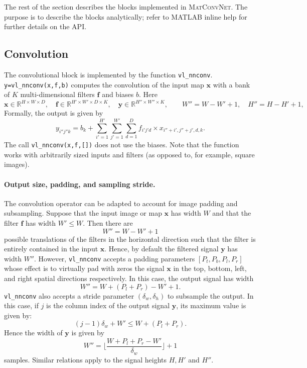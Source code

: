 \documentclass[12pt]{article}
\newcommand{\real}{\mathbb{R}}
\newcommand{\vlnn}{\textsc{MatConvNet}\xspace}
\newcommand{\bx}{\mathbf{x}}
\newcommand{\by}{\mathbf{y}}
\newcommand{\bff}{\mathbf{f}}
\begin{document}
The rest of the section describes the blocks implemented in \vlnn. The purpose is to describe the blocks analytically; refer to MATLAB inline help for further details on the API.

\subsection{Convolution}\label{s:convolution}

The convolutional block is implemented by the function \verb!vl_nnconv!. \verb!y=vl_nnconv(x,f,b)! computes the convolution of the input map $\bx$ with a bank of $K$ multi-dimensional filters $\bff$ and biases $b$. Here
\[
 \bx\in\real^{H \times W \times D}, \quad
 \bff\in\real^{H' \times W' \times D \times K}, \quad
 \by\in\real^{H'' \times W'' \times K}, \quad
 \quad
 W'' = W - W' + 1,
 \quad
 H'' = H - H' + 1,
\]
Formally, the output  is given by
\[
y_{i''j''k}
=
b_k
+
\sum_{i'=1}^{H'}
\sum_{j'=1}^{W'}
\sum_{d=1}^D
f_{i'j'd} \times x_{i''+i',j''+j',d,k}.
\]
The call \verb!vl_nnconv(x,f,[])! does not use the biases. Note that the function works with arbitrarily sized inputs and filters (as opposed to, for example, square images).

\paragraph{Output size, padding, and sampling stride.} The convolution operator can be adapted to account for image padding and subsampling. Suppose that the input image or map $\bx$ has width $W$ and that the filter $\bff$ has width $W' \leq W$. Then there are 
\[
  W'' = W - W' + 1
\]
possible translations of the filters in the horizontal direction such that the filter is entirely contained in the input $\bx$. Hence, by default the filtered signal $\by$ has width $W''$. However, \verb!vl_nnconv! accepts a padding parameters $[P_t,P_b,P_l,P_r]$ whose effect is to virtually pad with zeros the signal $\bx$ in the top, bottom, left, and right  spatial directions respectively. In this case, the output signal has width
\[
  W'' = W + (P_l + P_r) - W' + 1.
\]
\verb!vl_nnconv! also accepts a stride parameter $(\delta_w,\delta_h)$ to subsample the output. In this case, if $j$ is the column index of the output signal $\by$, its maximum value is given by:
\[
(j-1)\delta_w + W' \leq W + (P_l+P_r).
\]
Hence the width of $\by$ is given by
\[
W'' = \lfloor
\frac{W + P_l+P_r - W'}{\delta_w}
\rfloor + 1
\]
samples. Similar relations apply to the signal heights $H,H'$ and $H''$.
\end{document}
